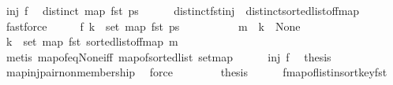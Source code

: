 \begin{isabellebody}
\ {\isacartoucheopen}inj\ f{\isacartoucheclose}\ \isamarkupfalse%
\ {\isachardoublequoteopen}distinct\ {\isacharparenleft}{\kern0pt}map\ fst\ {\isacharquery}{\kern0pt}ps{\isacharparenright}{\kern0pt}{\isachardoublequoteclose}\isanewline
\ \ \ \ \isamarkupfalse%
\ distinct{\isacharunderscore}{\kern0pt}fst{\isacharunderscore}{\kern0pt}inj\ \ distinct{\isacharunderscore}{\kern0pt}sorted{\isacharunderscore}{\kern0pt}list{\isacharunderscore}{\kern0pt}of{\isacharunderscore}{\kern0pt}fmap\ \isamarkupfalse%
\ fastforce\isanewline
\ \ \isamarkupfalse%
\ \isamarkupfalse%
\ {\isachardoublequoteopen}f\ k\ {\isasymnotin}\ set\ {\isacharparenleft}{\kern0pt}map\ fst\ {\isacharquery}{\kern0pt}ps{\isacharparenright}{\kern0pt}{\isachardoublequoteclose}\isanewline
\ \ \isamarkupfalse%
\ {\isacharminus}{\kern0pt}\isanewline
\ \ \ \ \isamarkupfalse%
\ {\isacartoucheopen}m\ {\isachardollar}{\kern0pt}{\isachardollar}{\kern0pt}\ k\ {\isacharequal}{\kern0pt}\ None{\isacartoucheclose}\ \isamarkupfalse%
\ {\isachardoublequoteopen}k\ {\isasymnotin}\ set\ {\isacharparenleft}{\kern0pt}map\ fst\ {\isacharparenleft}{\kern0pt}sorted{\isacharunderscore}{\kern0pt}list{\isacharunderscore}{\kern0pt}of{\isacharunderscore}{\kern0pt}fmap\ m{\isacharparenright}{\kern0pt}{\isacharparenright}{\kern0pt}{\isachardoublequoteclose}\isanewline
\ \ \ \ \ \ \isamarkupfalse%
\ {\isacharparenleft}{\kern0pt}metis\ map{\isacharunderscore}{\kern0pt}of{\isacharunderscore}{\kern0pt}eq{\isacharunderscore}{\kern0pt}None{\isacharunderscore}{\kern0pt}iff\ map{\isacharunderscore}{\kern0pt}of{\isacharunderscore}{\kern0pt}sorted{\isacharunderscore}{\kern0pt}list\ set{\isacharunderscore}{\kern0pt}map{\isacharparenright}{\kern0pt}\isanewline
\ \ \ \ \isamarkupfalse%
\ {\isacartoucheopen}inj\ f{\isacartoucheclose}\ \isamarkupfalse%
\ {\isacharquery}{\kern0pt}thesis\isanewline
\ \ \ \ \ \ \isamarkupfalse%
\ map{\isacharunderscore}{\kern0pt}inj{\isacharunderscore}{\kern0pt}pair{\isacharunderscore}{\kern0pt}non{\isacharunderscore}{\kern0pt}membership\ \isamarkupfalse%
\ force\isanewline
\ \ \isamarkupfalse%
\isanewline
\ \ \isamarkupfalse%
\ \isamarkupfalse%
\ {\isacharquery}{\kern0pt}thesis\isanewline
\ \ \ \ \isamarkupfalse%
\ fmap{\isacharunderscore}{\kern0pt}of{\isacharunderscore}{\kern0pt}list{\isacharunderscore}{\kern0pt}insort{\isacharunderscore}{\kern0pt}key{\isacharunderscore}{\kern0pt}fst\ \isamarkupfalse%

\end{isabellebody}

